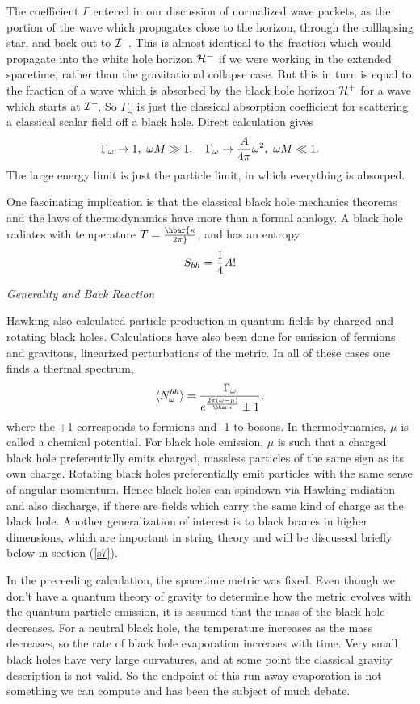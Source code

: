 \documentclass[12pt]{article}
\newcommand{\be}{\begin{equation}}
\newcommand{\ee}{\end{equation}}
\def\fh{{\cal H}^+}
\def\ph{{\cal H}^-}
\def\pinf{{\cal I}^-}
\begin{document}
The coefficient $\Gamma$ entered in our discussion of normalized wave packets,
as the portion of the wave which propagates close to the horizon, through
the colllapsing star, and back out to $\pinf\!$. This is almost identical
to the fraction which would propagate into the white hole horizon $\ph$
if we were working in the extended spacetime, rather than the gravitational
collapse case. But this in turn is equal to the fraction of a wave
which is absorbed by the black hole horizon $\fh$ for a wave which starts
at $\pinf\!$. So $\Gamma _{\omega}$ is just the classical absorption coefficient
for scattering a classical scalar field off a black hole.  Direct
calculation gives
%
\be\label{absorption}\Gamma _{\omega}\rightarrow 1 ,\  \omega M\gg 1, \quad
\Gamma _{\omega}\rightarrow {A\over 4\pi} \omega ^2 ,\  \omega M\ll 1 .\ee
%
The large energy limit is just the particle
limit, in which everything is absorped.

One fascinating implication is that the classical black hole mechanics theorems
and the laws of thermodynamics have more than a formal analogy. A black hole
radiates with  temperature $T=\hbar {\kappa\over 2\pi}$, and has an entropy
%
\be\label{bhentropy} S_{bh}= {1\over 4} A!\ee
%

\vskip 0.1in\noindent
{\it Generality and Back Reaction }
\vskip 0.05in

Hawking also calculated particle production in quantum fields by charged
and rotating black holes. Calculations have also been done for emission
of fermions and gravitons, linearized perturbations of the metric.  In all
of these
cases one finds a thermal spectrum,
%
\be\label{thermal}\langle N_\omega^{bh} \rangle = {\Gamma_{\omega} \over e^{ {2\pi
(\omega -\mu ) \over
\hbar \kappa} }\pm 1},\ee
%
where the +1 corresponds to fermions and -1 to bosons. In thermodynamics,
$\mu$ is  called a chemical potential. For black hole emission, $\mu$ is such
that a charged black hole preferentially emits charged, massless particles
of the same sign as its own charge. Rotating black holes preferentially emit
particles with the same sense of angular momentum. Hence black holes
can spindown via Hawking radiation and also discharge, if there are fields
which carry the same kind of charge as the black hole.
Another generalization of interest is to black branes in higher dimensions,
which are important in string theory and will be discussed briefly below in
section (\ref{s7}).

In the preceeding calculation, the spacetime metric was fixed. Even though
we don't have a quantum theory of gravity to determine how
the metric evolves with the quantum particle emission, it is assumed that
the mass of the black hole decreases.  For a neutral black hole, the temperature
increases as the mass decreases, so the rate of black hole evaporation
increases with time.  Very small black holes have very large curvatures,
and at some point the classical gravity description is not valid. So
the endpoint of this run away evaporation is not something we can compute
and has been the
subject of much debate.
\end{document}
